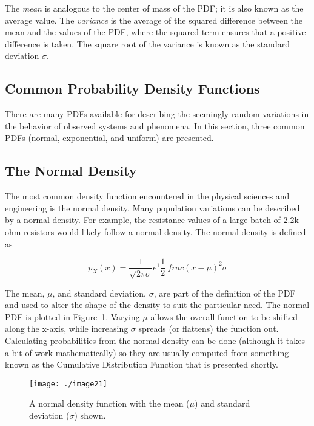{The \emph{mean} is analogous to the center of mass of the PDF; it is
also known as the average value. The \emph{variance} is the average of
the squared difference between the mean and the values of the PDF, where
the squared term ensures that a positive difference is taken. The square
root of the variance is known as the standard deviation $\sigma$.

\subsection{Common Probability Density Functions}
\label{subsection:common-probability-density-functions}

There are many PDFs available for describing the seemingly random
variations in the behavior of observed systems and phenomena. In this
section, three common PDFs (normal, exponential, and uniform) are
presented.

\subsection*{The Normal Density}
\label{subsection:the-normal-density}


The most common density function encountered in the physical sciences
and engineering is the normal density. Many population
variations can be described by a normal density. For example, the
resistance values of a large batch of 2.2k ohm resistors would likely
follow a normal density. The normal density is defined as

\begin{equation}
\label{equ:normalDensity}
p_X(x) = \frac{1}{\sqrt{2\pi\sigma}} e^1\frac{1}{2} \ frac{(x-\mu)^2}{\sigma}
\end{equation}

The mean, $\mu$, and standard deviation, $\sigma$, are part of the
definition of the PDF and used to alter the shape of the density to suit
the particular need. The normal PDF is plotted in 
Figure~\ref{figure:normalDensityFunction}. Varying
$\mu$ allows the overall function to be shifted along the x-axis,
while increasing $\sigma$ spreads (or flattens) the function out.
Calculating probabilities from the normal density can be done (although
it takes a bit of work mathematically) so they are usually computed from
something known as the Cumulative Distribution Function that is
presented shortly.

\begin{figure}
\texttt{[image: ./image21]}
\caption{A normal density function with the mean ($\mu$)
and standard deviation ($\sigma$) shown.}
\label{figure:normalDensityFunction}
\end{figure}


}

